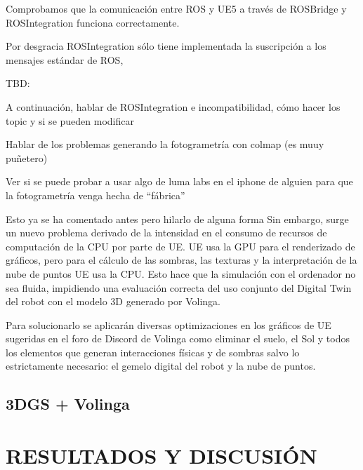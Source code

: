 \documentclass[a4paper, 12pt, spanish, twoside]{article}
\begin{document}
Comprobamos que la comunicación entre ROS y UE5 a través de ROSBridge y ROSIntegration funciona correctamente.

Por desgracia ROSIntegration sólo tiene implementada la suscripción a los mensajes estándar de ROS,

TBD:

A continuación, hablar de ROSIntegration e incompatibilidad, cómo hacer los topic y si se pueden modificar

Hablar de los problemas generando la fotogrametría con colmap (es muuy puñetero)

Ver si se puede probar a usar algo de luma labs en el iphone de alguien para que la fotogrametría venga hecha de “fábrica”


Esto ya se ha comentado antes pero hilarlo de alguna forma {Sin embargo, surge un nuevo problema derivado de la intensidad en el consumo de recursos de computación de la CPU por parte de UE. UE usa la GPU para el renderizado de gráficos, pero para el cálculo de las sombras, las texturas y la interpretación de la nube de puntos UE usa la CPU. Esto hace que la simulación con el ordenador no sea fluida,} impidiendo una evaluación correcta del uso conjunto del Digital Twin del robot con el modelo 3D generado por Volinga. 

Para solucionarlo se aplicarán diversas optimizaciones en los gráficos de UE sugeridas en el foro de Discord de Volinga como eliminar el suelo, el Sol y todos los elementos que generan interacciones físicas y de sombras salvo lo estrictamente necesario: el gemelo digital del robot y la nube de puntos. 

\subsection{3DGS + Volinga}

\clearpage





\newpage
\section{RESULTADOS Y DISCUSIÓN} \label{sec:resultados_y_discusion}
\end{document}

